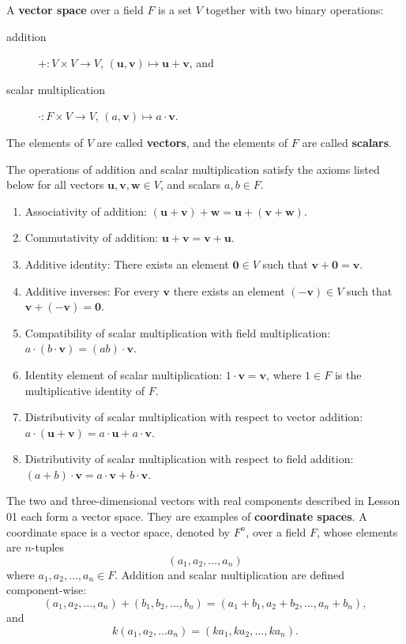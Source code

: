 \documentclass[a4paper,12pt]{amsart}
\begin{document}
    A \textbf{vector space} over a field $F$ is a set $V$ together with two binary operations: 
    
    \begin{description}
        \item[addition] $+: V \times V \to V$, $(\mathbf{u}, \mathbf{v}) \mapsto \mathbf{u} + \mathbf{v}$, and
        \item[scalar multiplication] $\cdot: F \times V \to V$, $(a, \mathbf{v}) \mapsto a \cdot \mathbf{v}$.
    \end{description} 

    The elements of $V$ are called \textbf{vectors}, and the elements of $F$ are called \textbf{scalars}.

    The operations of addition and scalar multiplication satisfy the axioms listed below for all vectors $\mathbf{u}, \mathbf{v}, \mathbf{w} \in V$, and scalars $a, b \in F$.

    \begin{enumerate}
        \item Associativity of addition: $(\mathbf{u} + \mathbf{v}) + \mathbf{w} = \mathbf{u} + (\mathbf{v} + \mathbf{w})$.
        \item Commutativity of addition: $\mathbf{u} + \mathbf{v} = \mathbf{v} + \mathbf{u}$.
        \item Additive identity: There exists an element $\mathbf{0} \in V$ such that $\mathbf{v} + \mathbf{0} = \mathbf{v}$.
        \item Additive inverses: For every $\mathbf{v}$ there exists an element $(-\mathbf{v}) \in V$ such that $\mathbf{v} + (-\mathbf{v}) = \mathbf{0}$.
        \item Compatibility of scalar multiplication with field multiplication: $a \cdot (b \cdot \mathbf{v}) = (ab) \cdot \mathbf{v}$.
        \item Identity element of scalar multiplication: $1 \cdot \mathbf{v} = \mathbf{v}$, where $1 \in F$ is the multiplicative identity of $F$.
        \item Distributivity of scalar multiplication with respect to vector addition: $a \cdot (\mathbf{u} + \mathbf{v}) = a \cdot \mathbf{u} + a \cdot \mathbf{v}$.
        \item Distributivity of scalar multiplication with respect to field addition: $(a + b) \cdot \mathbf{v} = a \cdot \mathbf{v} + b \cdot \mathbf{v}$.
    \end{enumerate}

    The two and three-dimensional vectors with real components described in Lesson 01 each form a vector space. They are examples of \textbf{coordinate spaces}. A coordinate space is a vector space, denoted by $F^n$, over a field $F$, whose elements are $n$-tuples
    \[ (a_1, a_2, \ldots, a_n) \]
    where $a_1, a_2, \ldots, a_n \in F$. Addition and scalar multiplication are defined component-wise:
    \[ (a_1, a_2, \ldots, a_n) + (b_1, b_2, \ldots, b_n) = (a_1 + b_1, a_2 + b_2, \ldots, a_n + b_n), \]
    and
    \[ k (a_1, a_2, \ldots a_n ) = (k a_1, k a_2, \ldots, k a_n). \]
\end{document}
